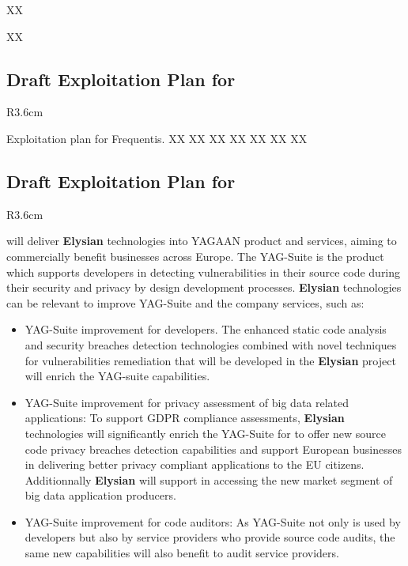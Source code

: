 \documentclass[a4paper,11pt]{article}
\newcommand{\project}[1]{\textbf{#1}\xspace}
\newcommand{\SECURITY}{\project{Elysian}}
\newcommand{\TheProject}{\SECURITY}
\begin{document}
XX

XX
\horizontalline

\subsection*{Draft Exploitation Plan for \FRQshort{}}
\vspace{-6pt}

\begin{wrapfigure}{R}{3.6cm}
\vspace{-1.3cm}
\hfill {}
\vspace{-0.8cm}
\end{wrapfigure}

Exploitation plan for Frequentis.
XX
XX
XX
XX
XX
XX
XX

\horizontalline

\subsection*{Draft Exploitation Plan for \YAGshort{}}
\vspace{-6pt}

\begin{wrapfigure}{R}{3.6cm}
\vspace{-1.3cm}
\hfill {}
\vspace{-0.8cm}
\end{wrapfigure}

 \YAGshort{} will deliver \TheProject technologies into YAGAAN product and services, aiming to commercially benefit businesses across Europe. The YAG-Suite is the \YAGshort{} product which supports developers in detecting vulnerabilities in their source code during their security and privacy by design development processes. \TheProject technologies can be relevant to improve YAG-Suite and the company services, such as:
\begin{itemize}
    \item YAG-Suite improvement for developers. The enhanced static code analysis and security breaches detection technologies combined with novel techniques for vulnerabilities remediation that will be developed in the \TheProject project will enrich the YAG-suite capabilities.
    \item YAG-Suite improvement for privacy assessment of big data related applications: To support GDPR compliance assessments, \TheProject technologies will significantly enrich the YAG-Suite for \YAGshort{} to offer new source code privacy breaches detection capabilities and support European businesses in delivering better privacy compliant applications to the EU citizens. Additionnally \TheProject will support \YAGshort{} in accessing the new market segment of big data application producers.
    \item YAG-Suite improvement for code auditors: As YAG-Suite not only is used by developers but also by service providers who provide source code audits, the same new capabilities will also benefit to audit service providers.
\end{itemize}
\end{document}
